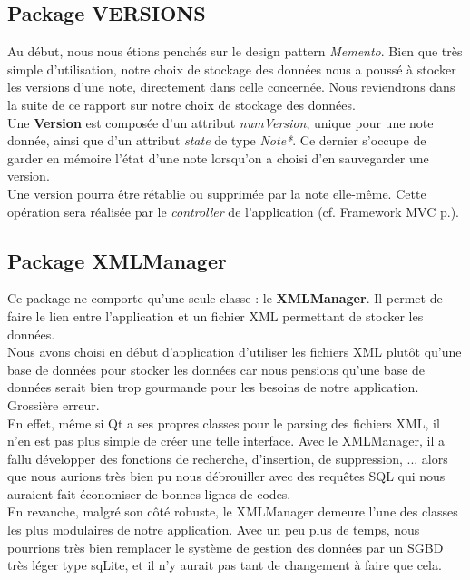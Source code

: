 \documentclass[a4paper]{report}
\begin{document}
\subsection{Package VERSIONS}
Au début, nous nous étions penchés sur le design pattern \textit{Memento}. Bien que très simple d'utilisation, notre choix de stockage des données nous a poussé à stocker les versions d'une note, directement dans celle concernée. Nous reviendrons dans la suite de ce rapport sur notre choix de stockage des données.\\
Une \textbf{Version} est composée d'un attribut \textit{numVersion}, unique pour une note donnée, ainsi que d'un attribut \textit{state} de type \textit{Note*}. Ce dernier s'occupe de garder en mémoire l'état d'une note lorsqu'on a choisi d'en sauvegarder une version.\\
Une version pourra être rétablie ou supprimée par la note elle-même. Cette opération sera réalisée par le \textit{controller} de l'application (cf. Framework MVC p.\pageref{MVC}).

\subsection{Package XMLManager}
Ce package ne comporte qu'une seule classe : le \textbf{XMLManager}. Il permet de faire le lien entre l'application et un fichier XML permettant de stocker les données.\\
Nous avons choisi en début d'application d'utiliser les fichiers XML plutôt qu'une base de données pour stocker les données car nous pensions qu'une base de données serait bien trop gourmande pour les besoins de notre application.\\
Grossière erreur.\\
En effet, même si Qt a ses propres classes pour le parsing des fichiers XML, il n'en est pas plus simple de créer une telle interface. Avec le XMLManager, il a fallu développer des fonctions de recherche, d'insertion, de suppression, ... alors que nous aurions très bien pu nous débrouiller avec des requêtes SQL qui nous auraient fait économiser de bonnes lignes de codes.\\
En revanche, malgré son côté robuste, le XMLManager demeure l'une des classes les plus modulaires de notre application. Avec un peu plus de temps, nous pourrions très bien remplacer le système de gestion des données par un SGBD très léger type sqLite, et il n'y aurait pas tant de changement à faire que cela.
\end{document}
